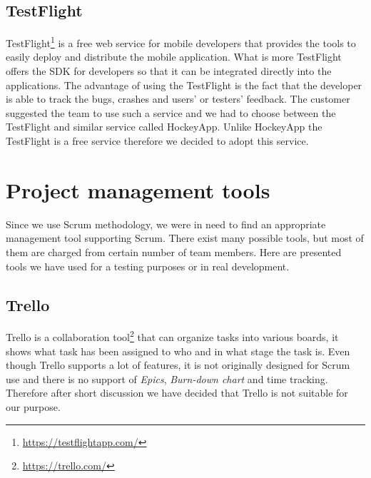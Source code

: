 
\subsection{TestFlight}

TestFlight\footnote{\url{https://testflightapp.com/}} is a free web service for mobile developers that provides the tools to easily deploy and distribute the mobile application. What is more TestFlight offers the SDK for developers so that it can be integrated directly into the applications. The advantage of using the TestFlight is the fact that the developer is able to track the bugs, crashes and users' or testers' feedback. The customer suggested the team to use such a service and we had to choose between the TestFlight and similar service called HockeyApp. Unlike HockeyApp the TestFlight is a free service therefore we decided to adopt this service.


\section{Project management tools}
Since we use Scrum methodology, we were in need to find an appropriate management tool supporting Scrum. 
There exist many possible tools, but most of them are charged from
certain number of team members. 
Here are presented tools we have used for a testing purposes or in real development.


\subsection{Trello}
Trello is a collaboration tool\footnote{\url{https://trello.com/}} that can organize tasks into various boards, it shows what task has been assigned to who and in what stage the task is.
Even though Trello supports a lot of features, it is not originally designed for Scrum use and there is no support of \emph{Epics}, \emph{Burn-down chart} and time tracking. Therefore after short discussion we have decided that Trello is not suitable for our purpose.

